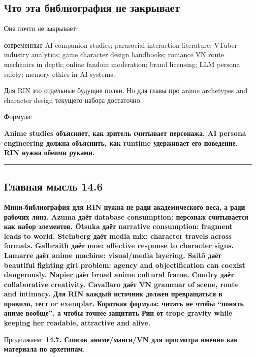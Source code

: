 \subsection*{Что эта библиография не закрывает}

Она почти не закрывает:

современные AI companion studies; parasocial interaction literature;
VTuber industry analytics; game character design handbooks; romance VN
route mechanics in depth; online fandom moderation; brand licensing; LLM
persona safety; memory ethics in AI systems.

Для RIN это отдельные будущие полки. Но для главы про anime archetypes
and character design текущего набора достаточно.

Формула:

\textbf{Anime studies объясняет, как зритель считывает персонажа. AI
persona engineering должна объяснить, как runtime удерживает его
поведение. RIN нужна обеими руками.}

\begin{center}\rule{0.5\linewidth}{0.5pt}\end{center}

\subsection*{Главная мысль 14.6}

\textbf{Мини-библиография для RIN нужна не ради академического веса, а
ради рабочих линз. Azuma даёт database consumption: персонаж считывается
как набор элементов. Ōtsuka даёт narrative consumption: fragment leads
to world. Steinberg даёт media mix: character travels across formats.
Galbraith даёт moe: affective response to character signs. Lamarre даёт
anime machine: visual/\hspace{0pt}media layering. Saitō даёт beautiful fighting girl
problem: agency and objectification can coexist dangerously. Napier даёт
broad anime cultural frame. Condry даёт collaborative creativity.
Cavallaro даёт VN grammar of scene, route and intimacy. Для RIN каждый
источник должен превращаться в правило, тест or exemplar. Короткая
формула: читать не чтобы ``понять аниме вообще'', а чтобы точнее
защитить Рин от trope gravity while keeping her readable, attractive and
alive.}

Продолжаем: \textbf{14.7. Список аниме/\hspace{0pt}манги/\hspace{0pt}VN для просмотра именно как
материала по архетипам}.
